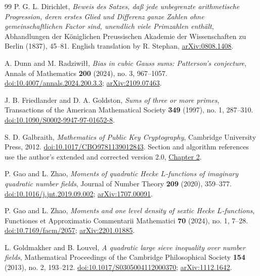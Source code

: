 \documentclass[11pt,a4paper]{article}
\numberwithin{equation}{section}
\numberwithin{figure}{section}
\theoremstyle{definition}
\theoremstyle{remark}
\begin{document}
\begin{thebibliography}{99}
P. G. L. Dirichlet,
\emph{Beweis des Satzes, da\ss{} jede unbegrenzte arithmetische
Progression, deren erstes Glied und Differenz ganze Zahlen ohne
gemeinschaftlichen Factor sind, unendlich viele Primzahlen enth\"alt},
Abhandlungen der K\"oniglichen Preussischen Akademie der Wissenschaften
zu Berlin (1837), 45--81.
English translation by R. Stephan,
\href{https://arxiv.org/abs/0808.1408}{arXiv:0808.1408}.

A. Dunn and M. Radziwi\l\l,
\emph{Bias in cubic Gauss sums: Patterson's conjecture},
Annals of Mathematics \textbf{200} (2024), no. 3, 967--1057.
\href{https://doi.org/10.4007/annals.2024.200.3.3}{doi:10.4007/annals.2024.200.3.3};
\href{https://arxiv.org/abs/2109.07463}{arXiv:2109.07463}.

J. B. Friedlander and D. A. Goldston,
\emph{Sums of three or more primes},
Transactions of the American Mathematical Society \textbf{349} (1997),
no. 1, 287--310.
\href{https://doi.org/10.1090/S0002-9947-97-01652-8}{doi:10.1090/S0002-9947-97-01652-8}.

S. D. Galbraith,
\emph{Mathematics of Public Key Cryptography},
Cambridge University Press, 2012.
\href{https://doi.org/10.1017/CBO9781139012843}{doi:10.1017/CBO9781139012843}.
Section and algorithm references use the author's extended and corrected
version 2.0, \href{https://www.math.auckland.ac.nz/~sgal018/crypto-book/ch2.pdf}{Chapter 2}.

P. Gao and L. Zhao,
\emph{Moments of quadratic Hecke $L$-functions of imaginary quadratic
number fields},
Journal of Number Theory \textbf{209} (2020), 359--377.
\href{https://doi.org/10.1016/j.jnt.2019.09.002}{doi:10.1016/j.jnt.2019.09.002};
\href{https://arxiv.org/abs/1707.00091}{arXiv:1707.00091}.

P. Gao and L. Zhao,
\emph{Moments and one level density of sextic Hecke $L$-functions},
Functiones et Approximatio Commentarii Mathematici \textbf{70} (2024),
no. 1, 7--28.
\href{https://doi.org/10.7169/facm/2057}{doi:10.7169/facm/2057};
\href{https://arxiv.org/abs/2201.01885}{arXiv:2201.01885}.

L. Goldmakher and B. Louvel,
\emph{A quadratic large sieve inequality over number fields},
Mathematical Proceedings of the Cambridge Philosophical Society
\textbf{154} (2013), no. 2, 193--212.
\href{https://doi.org/10.1017/S0305004112000370}{doi:10.1017/S0305004112000370};
\href{https://arxiv.org/abs/1112.1642}{arXiv:1112.1642}.


\end{thebibliography}
\end{document}
